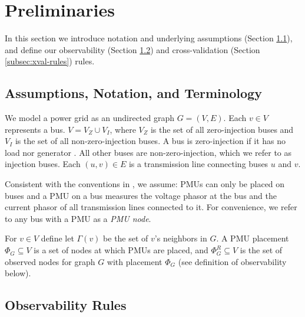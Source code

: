 \section{Preliminaries}
\label{sec:prelim}

In this section we introduce notation and underlying assumptions (Section \ref{subsec:notation-assume}), 
and define our observability (Section \ref{subsec:observe}) and cross-validation (Section \ref{subsec:xval-rules}) rules.


\subsection{Assumptions, Notation, and Terminology}
\label{subsec:notation-assume}

We model a power grid as an undirected graph $G=(V,E)$.  Each $v \in V$ represents a bus. %
$V=V_Z \cup V_I$, where $V_Z$ is the set of all zero-injection buses and $V_I$ is the set of all non-zero-injection buses.  A bus is zero-injection if it has no load nor generator \cite{Zhang10}.
All other buses are non-zero-injection, which we refer to as injection buses.
Each $(u,v) \in E$ is a transmission line connecting buses $u$ and $v$. 

Consistent with the conventions in \cite{Baldwin93,Brueni05,Abur06,Mili90,Xu04,Xu05}, we assume: PMUs can only be placed on buses and a PMU on a bus measures 
the voltage phasor at the bus and the current phasor of all transmission lines connected to it. For convenience, we refer to any bus with a PMU as a \emph{PMU node}. 

For  $v\in V$ define let $\Gamma(v)$ be the set of $v$'s neighbors in $G$.
A PMU placement $\Phi_G \subseteq V$ is a set of nodes at which PMUs are placed,
and $\Phi^R_G\subseteq V$ is the set of observed nodes for graph $G$ with placement $\Phi_G$ (see definition of observability below).


\subsection{Observability Rules}
\label{subsec:observe}

